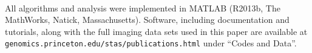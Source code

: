

%
All algorithms and analysis were implemented in MATLAB\textsuperscript{\textregistered} (R2013b, The MathWorks, Natick, Massachusetts).
%
Software, including documentation and tutorials, along with the full imaging data sets used in this paper are available at \texttt{genomics.princeton.edu/stas/publications.html} under ``Codes and Data''.

